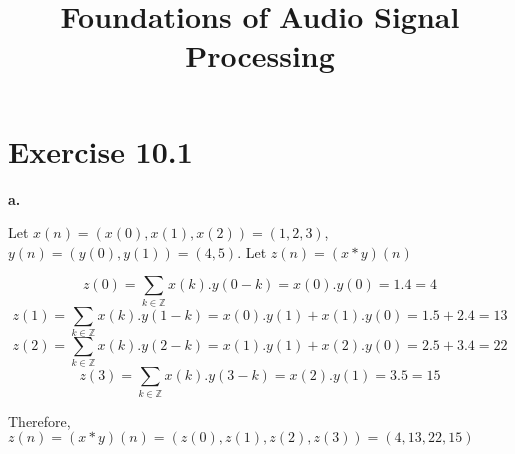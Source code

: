 \documentclass[12pt]{article}
\title{Foundations of Audio Signal Processing\\ \ass}
\author{\auth}
\begin{document}
	\maketitle
	\section*{Exercise 10.1}
	    \textbf{a.}
	    
	        Let $ x(n) = (x(0), x(1), x(2)) = (1, 2, 3)$, $ y(n) = (y(0), y(1)) = (4, 5)$.
	        Let $ z(n) = (x * y)(n)$ \newline
	        
	        $$z(0) = \sum_{k \in \mathbb{Z}} x(k).y(0 - k) = x(0).y(0) = 1.4 = 4$$
	        $$z(1) = \sum_{k \in \mathbb{Z}} x(k).y(1 - k) = x(0).y(1) + x(1).y(0) = 1.5 + 2.4 = 13$$
	        $$z(2) = \sum_{k \in \mathbb{Z}} x(k).y(2 - k) = x(1).y(1) + x(2).y(0) = 2.5 + 3.4 = 22$$
	        $$z(3) = \sum_{k \in \mathbb{Z}} x(k).y(3 - k) = x(2).y(1) = 3.5 = 15$$
	        
	        Therefore, $z(n) = (x*y)(n) = (z(0), z(1), z(2), z(3)) = (4, 13, 22, 15)$ \newline
\end{document}

